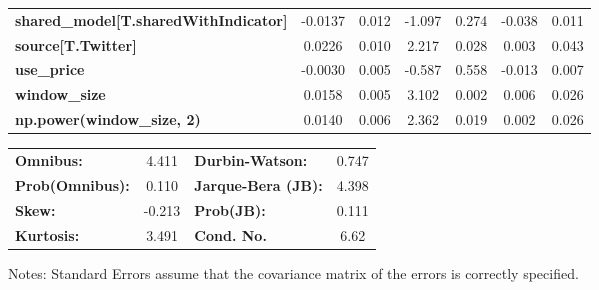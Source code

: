 \begin{center}
\begin{tabular}{lcccccc}
\textbf{shared\_model[T.sharedWithIndicator]} &      -0.0137  &        0.012     &    -1.097  &         0.274        &       -0.038    &        0.011     \\
\textbf{source[T.Twitter]}                    &       0.0226  &        0.010     &     2.217  &         0.028        &        0.003    &        0.043     \\
\textbf{use\_price}                           &      -0.0030  &        0.005     &    -0.587  &         0.558        &       -0.013    &        0.007     \\
\textbf{window\_size}                         &       0.0158  &        0.005     &     3.102  &         0.002        &        0.006    &        0.026     \\
\textbf{np.power(window\_size, 2)}            &       0.0140  &        0.006     &     2.362  &         0.019        &        0.002    &        0.026     \\
\bottomrule
\end{tabular}
\begin{tabular}{lclc}
\textbf{Omnibus:}       &  4.411 & \textbf{  Durbin-Watson:     } &    0.747  \\
\textbf{Prob(Omnibus):} &  0.110 & \textbf{  Jarque-Bera (JB):  } &    4.398  \\
\textbf{Skew:}          & -0.213 & \textbf{  Prob(JB):          } &    0.111  \\
\textbf{Kurtosis:}      &  3.491 & \textbf{  Cond. No.          } &     6.62  \\
\bottomrule
\end{tabular}
\end{center}

Notes: \newline
 [1] Standard Errors assume that the covariance matrix of the errors is correctly specified.